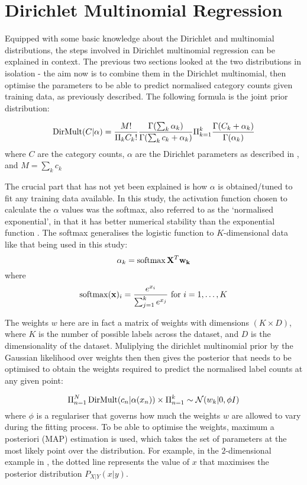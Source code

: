 \section{Dirichlet Multinomial Regression}
Equipped with some basic knowledge about the Dirichlet and multinomial distributions, the steps involved in Dirichlet multinomial regression can be explained in context. The previous two sections looked at the two distributions in isolation - the aim now is to combine them in the Dirichlet multinomial, then optimise the parameters to be able to predict normalised category counts given training data, as previously described. The following formula is the joint prior distribution:

\begin{equation}
    \operatorname{DirMult}(C|\alpha) = \frac{M!}{\Pi_k C_k!} \frac{\Gamma(\sum_k \alpha_k)}{\Gamma(\sum_k c_k + \alpha_k)} \Pi_{k=1}^k \frac{\Gamma(C_k + \alpha_k)}{\Gamma(\alpha_k)}
\end{equation}
where $C$ are the category counts, $\alpha$ are the Dirichlet parameters as described in , and $M = \sum_k c_k$

The crucial part that has not yet been explained is how $\alpha$ is obtained/tuned to fit any training data available. In this study, the activation function chosen to calculate the $\alpha$ values was the softmax, also referred to as the `normalised exponential', in that it has better numerical stability than the exponential function . The softmax generalises the logistic function to $K$-dimensional data like that being used in this study:
\begin{equation}
    \alpha_k = \operatorname{softmax}{\mathbf{X}^T \mathbf{w_k}}
\end{equation}
where \begin{equation}\label{eq:softmax}
    \operatorname{softmax}(\mathbf{x})_i = \frac{e^{x_i}}{\sum_{j=1}^k e^{x_j}} \text{ for } i = 1, \ldots, K
\end{equation}

The weights $w$ here are in fact a matrix of weights with dimensions $(K \times D)$, where $K$ is the number of possible labels across the dataset, and $D$ is the dimensionality of the dataset. Muliplying the dirichlet multinomial prior by the Gaussian likelihood over weights then then gives the posterior that needs to be optimised to obtain the weights required to predict the normalised label counts at any given point:

\begin{equation}
    \Pi_{n=1}^N \operatorname{DirMult} (c_n | \alpha(x_n)) \times \Pi_{n=1}^k \sim \mathcal{N}(w_k | 0, \phi I)
\end{equation}
where $\phi$ is a regulariser that governs how much the weights $w$ are allowed to vary during the fitting process. To be able to optimise the weights, maximum a posteriori (MAP) estimation is used, which takes the set of parameters at the most likely point over the distribution. For example, in the $2$-dimensional example in , the dotted line represents the value of $x$ that maximises the posterior distribution $P_{X|Y}(x|y)$.

